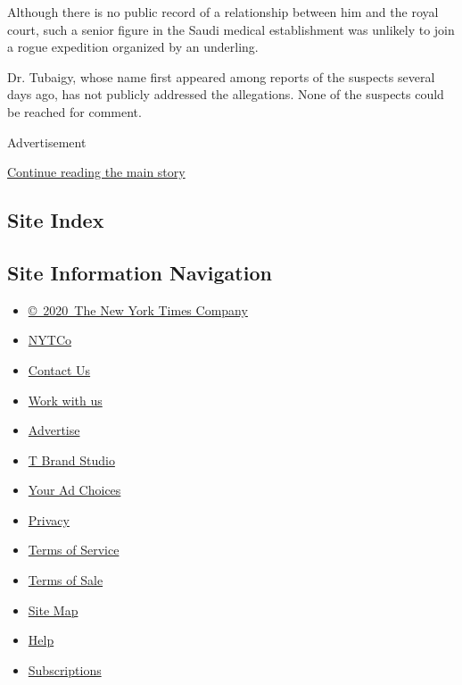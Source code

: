 Although there is no public record of a relationship between him and the
royal court, such a senior figure in the Saudi medical establishment was
unlikely to join a rogue expedition organized by an underling.

Dr. Tubaigy, whose name first appeared among reports of the suspects
several days ago, has not publicly addressed the allegations. None of
the suspects could be reached for comment.

Advertisement

\protect\hyperlink{after-bottom}{Continue reading the main story}

\hypertarget{site-index}{%
\subsection{Site Index}\label{site-index}}

\hypertarget{site-information-navigation}{%
\subsection{Site Information
Navigation}\label{site-information-navigation}}

\begin{itemize}
\tightlist
\item
  \href{https://help.nytimes.com/hc/en-us/articles/115014792127-Copyright-notice}{©~2020~The
  New York Times Company}
\end{itemize}

\begin{itemize}
\tightlist
\item
  \href{https://www.nytco.com/}{NYTCo}
\item
  \href{https://help.nytimes.com/hc/en-us/articles/115015385887-Contact-Us}{Contact
  Us}
\item
  \href{https://www.nytco.com/careers/}{Work with us}
\item
  \href{https://nytmediakit.com/}{Advertise}
\item
  \href{http://www.tbrandstudio.com/}{T Brand Studio}
\item
  \href{https://www.nytimes.com/privacy/cookie-policy\#how-do-i-manage-trackers}{Your
  Ad Choices}
\item
  \href{https://www.nytimes.com/privacy}{Privacy}
\item
  \href{https://help.nytimes.com/hc/en-us/articles/115014893428-Terms-of-service}{Terms
  of Service}
\item
  \href{https://help.nytimes.com/hc/en-us/articles/115014893968-Terms-of-sale}{Terms
  of Sale}
\item
  \href{https://spiderbites.nytimes.com}{Site Map}
\item
  \href{https://help.nytimes.com/hc/en-us}{Help}
\item
  \href{https://www.nytimes.com/subscription?campaignId=37WXW}{Subscriptions}
\end{itemize}
